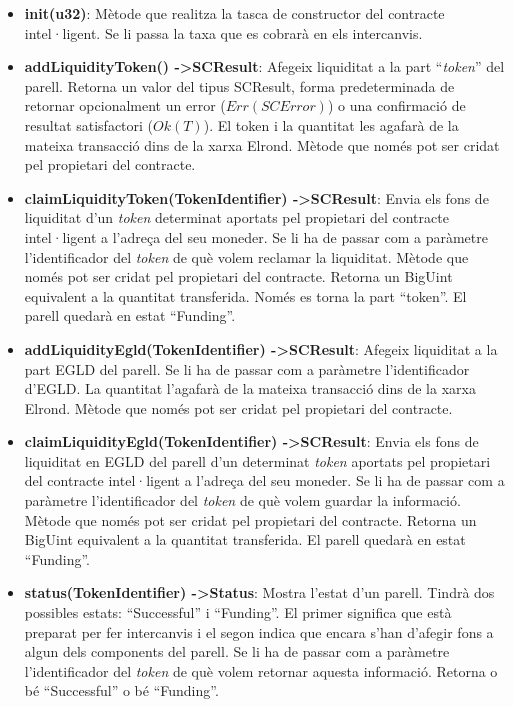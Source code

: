 \documentclass[11pt,a4paper]{article}
\begin{document}
\begin{itemize}
\item \textbf{init(u32)}: Mètode que realitza la tasca de constructor del contracte intel·ligent. Se li passa la taxa que es cobrarà en els intercanvis.
\item \textbf{addLiquidityToken() -\textgreater SCResult}: Afegeix liquiditat a la part ``\textit{token}'' del parell. Retorna un valor del tipus SCResult, forma predeterminada de retornar opcionalment un error (\(Err(SCError)\)) o una confirmació de resultat satisfactori (\(Ok(T)\)). El token i la quantitat les agafarà de la mateixa transacció dins de la xarxa Elrond. Mètode que només pot ser cridat pel propietari del contracte.
\item \textbf{claimLiquidityToken(TokenIdentifier)  -\textgreater SCResult}: Envia els fons de liquiditat d'un \textit{token} determinat aportats pel propietari del contracte intel·ligent a l'adreça del seu moneder. Se li ha de passar com a paràmetre l'identificador del \textit{token} de què volem reclamar la liquiditat. Mètode que només pot ser cridat pel propietari del contracte. Retorna un BigUint equivalent a la quantitat transferida. Només es torna la part ``token''. El parell quedarà en estat ``Funding''.
\item \textbf{addLiquidityEgld(TokenIdentifier)  -\textgreater SCResult}: Afegeix liquiditat a la part EGLD del parell. Se li ha de passar com a paràmetre l'identificador d'EGLD. La quantitat l'agafarà de la mateixa transacció dins de la xarxa Elrond. Mètode que només pot ser cridat pel propietari del contracte.
\item \textbf{claimLiquidityEgld(TokenIdentifier)  -\textgreater SCResult}: Envia els fons de liquiditat en EGLD del parell d'un determinat \textit{token} aportats pel propietari del contracte intel·ligent a l'adreça del seu moneder. Se li ha de passar com a paràmetre l'identificador del \textit{token} de què volem guardar la informació. Mètode que només pot ser cridat pel propietari del contracte. Retorna un BigUint equivalent a la quantitat transferida. El parell quedarà en estat ``Funding''.
\item \textbf{status(TokenIdentifier) -\textgreater Status}: Mostra l'estat d'un parell. Tindrà dos possibles estats: ``Successful'' i ``Funding''. El primer significa que està preparat per fer intercanvis i el segon indica que encara s'han d'afegir fons a algun dels components del parell. Se li ha de passar com a paràmetre l'identificador del \textit{token} de què volem retornar aquesta informació. Retorna o bé ``Successful'' o bé ``Funding''.

\end{itemize}
\end{document}

